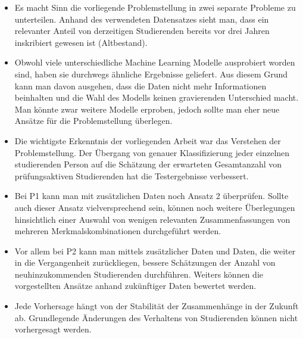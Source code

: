 \begin{itemize}
    \item Es macht Sinn die vorliegende Problemstellung in zwei separate Probleme zu unterteilen. Anhand des verwendeten Datensatzes sieht man, dass
          ein relevanter Anteil von derzeitigen Studierenden bereits vor drei Jahren inskribiert gewesen ist (Altbestand).

    \item Obwohl viele unterschiedliche Machine Learning Modelle ausprobiert worden sind, haben sie durchwegs \"ahnliche Ergebnisse geliefert.
          Aus diesem Grund kann man davon ausgehen, dass die Daten nicht mehr Informationen beinhalten und die Wahl des Modells keinen gravierenden Unterschied macht.
          Man k\"onnte zwar weitere Modelle erproben, jedoch sollte man eher neue Ans\"atze f\"ur die Problemstellung \"uberlegen.

    \item Die wichtigste Erkenntnis der vorliegenden Arbeit war das Verstehen der Problemstellung. Der \"Ubergang von genauer Klassifizierung jeder einzelnen
          studierenden Person auf die Sch\"atzung der erwarteten Gesamtanzahl von pr\"ufungsaktiven Studierenden hat die Testergebnisse verbessert.

    \item Bei P1 kann man mit zus\"atzlichen Daten noch Ansatz 2 \"uberpr\"ufen. Sollte auch dieser Ansatz vielversprechend sein, k\"onnen noch weitere
          \"Uberlegungen hinsichtlich einer Auswahl von wenigen relevanten Zusammenfassungen von mehreren Merkmalskombinationen durchgef\"uhrt werden.

    \item Vor allem bei P2 kann man mittels zus\"atzlicher Daten und Daten, die weiter in die Vergangenheit zur\"uckliegen, bessere Sch\"atzungen der
          Anzahl von neuhinzukommenden Studierenden durchf\"uhren. Weiters k\"onnen die vorgestellten Ans\"atze anhand zuk\"unftiger Daten bewertet werden.

    \item Jede Vorhersage h\"angt von der Stabilit\"at der Zusammenh\"ange in der Zukunft ab. Grundlegende \"Anderungen des Verhaltens von Studierenden
          k\"onnen nicht vorhergesagt werden.


\end{itemize}